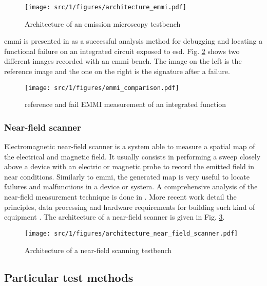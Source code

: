 \begin{figure}[!h]
  \centering
  \texttt{[image: src/1/figures/architecture\_emmi.pdf]}
  \caption{Architecture of an emission microscopy testbench}
  \label{fig:emmi}
\end{figure}

\gls{emmi} is presented in \cite{softfailEMMI} as a successful analysis method for debugging and locating a functional failure on an integrated circuit exposed to \gls{esd}.
Fig. \ref{fig:emmi-examples} shows two different images recorded with an \gls{emmi} bench.
The image on the left is the reference image and the one on the right is the signature after a failure.

\begin{figure}[!h]
  \centering
  \texttt{[image: src/1/figures/emmi\_comparison.pdf]}
  \caption{reference and fail EMMI measurement of an integrated function}
  \label{fig:emmi-examples}
\end{figure}


\subsubsection{Near-field scanner}

Electromagnetic near-field scanner is a system able to measure a spatial map of the electrical and magnetic field.
It usually consists in performing a sweep closely above a device with an electric or magnetic probe to record the emitted field in near conditions.
Similarly to \gls{emmi}, the generated map is very useful to locate failures and malfunctions in a device or system.
A comprehensive analysis of the near-field measurement technique is done in \cite{nfsFirstStudy}.
More recent work detail the principles, data processing and hardware requirements for building such kind of equipment \cite{planarNFSAntenna, NFSMeasurements, NFScanner}.
The architecture of a near-field scanner is given in Fig. \ref{fig:near-field-scanner}.

\begin{figure}[!h]
  \centering
  \texttt{[image: src/1/figures/architecture\_near\_field\_scanner.pdf]}
  \caption{Architecture of a near-field scanning testbench}
  \label{fig:near-field-scanner}
\end{figure}

\subsection{Particular test methods}

